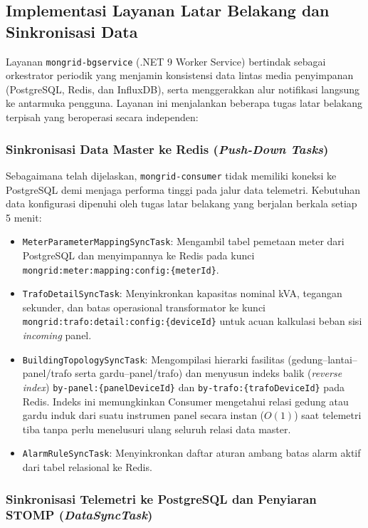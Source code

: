 \subsection{Implementasi Layanan Latar Belakang dan Sinkronisasi Data}

Layanan \texttt{mongrid-bgservice} (.NET 9 Worker Service) bertindak sebagai orkestrator periodik yang menjamin konsistensi data lintas media penyimpanan (PostgreSQL, Redis, dan InfluxDB), serta menggerakkan alur notifikasi langsung ke antarmuka pengguna. Layanan ini menjalankan beberapa tugas latar belakang terpisah yang beroperasi secara independen:

\subsubsection{Sinkronisasi Data Master ke Redis (\textit{Push-Down Tasks})}

Sebagaimana telah dijelaskan, \texttt{mongrid-consumer} tidak memiliki koneksi ke PostgreSQL demi menjaga performa tinggi pada jalur data telemetri. Kebutuhan data konfigurasi dipenuhi oleh tugas latar belakang yang berjalan berkala setiap 5 menit:
\begin{itemize}[leftmargin=*, itemsep=0pt]
  \item \texttt{MeterParameterMappingSyncTask}: Mengambil tabel pemetaan meter dari PostgreSQL dan menyimpannya ke Redis pada kunci \texttt{mongrid:meter:mapping:config:\{meterId\}}.
  \item \texttt{TrafoDetailSyncTask}: Menyinkronkan kapasitas nominal kVA, tegangan sekunder, dan batas operasional transformator ke kunci \texttt{mongrid:trafo:detail:config:\{deviceId\}} untuk acuan kalkulasi beban sisi \textit{incoming} panel.
  \item \texttt{BuildingTopologySyncTask}: Mengompilasi hierarki fasilitas (gedung--lantai--panel/trafo serta gardu--panel/trafo) dan menyusun indeks balik (\textit{reverse index}) \texttt{by-panel:\{panelDeviceId\}} dan \texttt{by-trafo:\{trafoDeviceId\}} pada Redis. Indeks ini memungkinkan Consumer mengetahui relasi gedung atau gardu induk dari suatu instrumen panel secara instan ($O(1)$) saat telemetri tiba tanpa perlu menelusuri ulang seluruh relasi data master.
  \item \texttt{AlarmRuleSyncTask}: Menyinkronkan daftar aturan ambang batas alarm aktif dari tabel relasional ke Redis.
\end{itemize}

\subsubsection{Sinkronisasi Telemetri ke PostgreSQL dan Penyiaran STOMP (\textit{DataSyncTask})}

